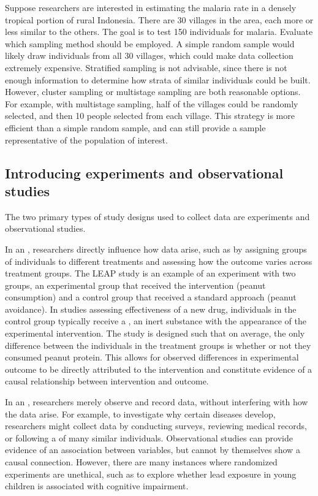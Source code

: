 \begin{example}{Suppose researchers are interested in estimating the malaria rate in a densely tropical portion of rural Indonesia. There are 30 villages in the area, each more or less similar to the others. The goal is to test 150 individuals for malaria. Evaluate which sampling method should be employed.}
	A simple random sample would likely draw individuals from all 30 villages, which could make data collection extremely expensive. Stratified sampling is not advisable, since there is not enough information to determine how strata of similar individuals could be built. However, cluster sampling or multistage sampling are both reasonable options. For example, with multistage sampling, half of the villages could be randomly selected, and then 10 people selected from each village. This strategy is more efficient than a simple random sample, and can still provide a sample representative of the population of interest.
\end{example}




\subsection{Introducing experiments and observational studies}

The two primary types of study designs used to collect data are experiments and observational studies.

In an , researchers directly influence how data arise, such as by assigning groups of individuals to different treatments and assessing how the outcome varies across treatment groups. The LEAP study is an example of an experiment with two groups, an experimental group that received the intervention (peanut consumption) and a control group that received a standard approach (peanut avoidance). In studies assessing effectiveness of a new drug, individuals in the control group typically receive a , an inert substance with the appearance of the experimental intervention. The study is designed such that on average, the only difference between the individuals in the treatment groups is whether or not they consumed peanut protein. This allows for observed differences in experimental outcome to be directly attributed to the intervention and constitute evidence of a causal relationship between intervention and outcome. 

In an , researchers merely observe and record data, without interfering with how the data arise. For example, to investigate why certain diseases develop, researchers might collect data by conducting surveys, reviewing medical records, or following a  of many similar individuals. Observational studies can provide evidence of an association between variables, but cannot by themselves show a causal connection. However, there are many instances where randomized experiments are unethical, such as to explore whether lead exposure in young children is associated with cognitive impairment. 

